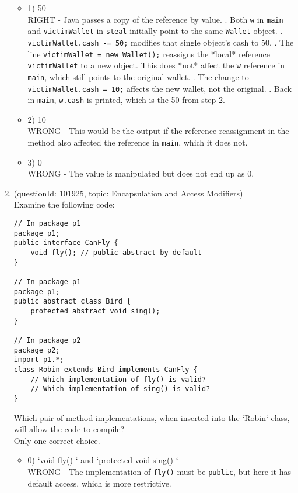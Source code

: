 \documentclass[12pt]{article}
\begin{document}
\begin{enumerate}[label=(\arabic*)]
\begin{itemize}
\item 1) 50
 \\ 
RIGHT - Java passes a copy of the reference by value. . Both \verb|w| in \verb|main| and \verb|victimWallet| in \verb|steal| initially point to the same \verb|Wallet| object. . \verb|victimWallet.cash -= 50;| modifies that single object's cash to 50. . The line \verb|victimWallet = new Wallet();| reassigns the *local* reference \verb|victimWallet| to a new object. This does *not* affect the \verb|w| reference in \verb|main|, which still points to the original wallet. . The change to \verb|victimWallet.cash = 10;| affects the new wallet, not the original. . Back in \verb|main|, \verb|w.cash| is printed, which is the 50 from step 2.

\item 2) 10
 \\ 
WRONG - This would be the output if the reference reassignment in the method also affected the reference in \verb|main|, which it does not.

\item 3) 0
 \\ 
WRONG - The value is manipulated but does not end up as 0.

\end{itemize}
\item (questionId: 101925, topic: Encapsulation and Access Modifiers) \\ 
Examine the following code:
\begin{verbatim}
// In package p1
package p1;
public interface CanFly {
    void fly(); // public abstract by default
}

// In package p1
package p1;
public abstract class Bird {
    protected abstract void sing();
}

// In package p2
package p2;
import p1.*;
class Robin extends Bird implements CanFly {
    // Which implementation of fly() is valid?
    // Which implementation of sing() is valid?
}
\end{verbatim}
Which pair of method implementations, when inserted into the `Robin` class, will allow the code to compile?
\\ \noindent Only one correct choice. 
\begin{itemize}
\item 0) `void fly() {}` and `protected void sing() {}`
 \\ 
WRONG - The implementation of \verb|fly()| must be \verb|public|, but here it has default access, which is more restrictive.


\end{itemize}
\end{enumerate}
\end{document}

